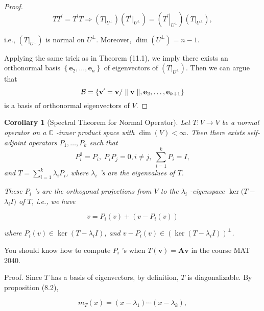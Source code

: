 \documentclass[11pt]{article}
\newtheorem{corollary}[theorem]{Corollary}
\begin{document}
\begin{proof}
\[
T{T}^{\prime } = {T}^{\prime }T \Rightarrow  \left( {\left. T\right| }_{{U}^{ \bot  }}\right) \left( {{T}^{\prime }{\left. \right| }_{{U}^{ \bot  }}}\right)  = \left( {\left. {T}^{\prime }\right| }_{{U}^{ \bot  }}\right) \left( {\left. T\right| }_{{U}^{ \bot  }}\right) ,
\]

i.e., \(\left( {\left. T\right| }_{{U}^{ \bot  }}\right)\) is normal on \({U}^{ \bot  }\). Moreover, \(\dim \left( {U}^{ \bot  }\right)  = n - 1\).

Applying the same trick as in Theorem (11.1), we imply there exists an orthonormal basis \(\left\{  {{\mathbf{e}}_2,\ldots ,{\mathbf{e}}_n}\right\}\) of eigenvectors of \(\left( {\left. T\right| }_{{U}^{ \bot  }}\right)\). Then we can argue that
\[
\mathcal{B} = \left\{  {{\bf v}^{\prime } = \mathbf{v}/\parallel \mathbf{v}\parallel ,{\mathbf{e}}_2,\ldots ,{\mathbf{e}}_{k + 1}}\right\}
\]
is a basis of orthonormal eigenvectors of \(V\).
\end{proof}

\begin{corollary}[Spectral Theorem for Normal Operator] Let \(T : V \rightarrow  V\) be a normal operator on a \(\mathbb{C}\) -inner product space with \(\dim \left( V\right)  < \infty\). Then there exists self-adjoint operators \({P}_1,\ldots ,{P}_{k}\) such that
\[
{P}_{i}^2 = {P}_{i},\;{P}_{i}{P}_{j} = 0,i \neq  j,\;\mathop{\sum }\limits_{{i = 1}}^{k}{P}_{i} = I,
\]
and \(T = \mathop{\sum }\limits_{{i = 1}}^{k}{\lambda }_{i}{P}_{i}\), where \({\lambda }_{i}\) ’s are the eigenvalues of \(T\).

These \({P}_{i}\) ’s are the orthogonal projections from \(V\) to the \({\lambda }_{i}\) -eigenspace \(\ker (T -\)  \({\lambda }_{i}I)\) of \(T\), i.e., we have

\[
v = {P}_{i}\left( v\right)  + \left( {v - {P}_{i}\left( v\right) }\right)
\]

where \({P}_{i}\left( v\right)  \in  \ker \left( {T - {\lambda }_{i}I}\right)\), and \(v - {P}_{i}\left( v\right)  \in  {\left( \ker \left( T - {\lambda }_{i}I\right) \right) }^{ \bot  }\).
\end{corollary}

You should know how to compute \({P}_{i}\) ’s when \(T\left( \mathbf{v}\right)  = \mathbf{{Av}}\) in the course MAT 2040.

Proof. Since \(T\) has a basis of eigenvectors, by definition, \(T\) is diagonalizable. By proposition (8.2),

\[
{m}_{T}\left( x\right)  = \left( {x - {\lambda }_1}\right) \cdots \left( {x - {\lambda }_{k}}\right) ,
\]
\end{document}
